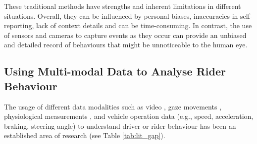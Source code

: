 These traditional methods have strengths and inherent limitations in different situations. Overall, they can be influenced by personal biases, inaccuracies in self-reporting, lack of context details and can be time-consuming. In contrast, the use of sensors and cameras to capture events as they occur can provide an unbiased and detailed record of behaviours that might be unnoticeable to the human eye.

    \subsection{Using Multi-modal Data to Analyse Rider Behaviour}

The usage of different data modalities such as video \cite{hong2022evaluation, 10.1145/3313831.3376499,KOVACSOVA2018270, KAYA2021106380, WHITE2023182}, gaze movements \cite{visualAttenstionTobii, 10.1145/3544548.3581049, MANTUANO2017408,10.1145/3204493.3214307, KAYA2021106380, VONSTULPNAGEL2020222}, physiological measurements \cite{COBB2021172, PhysiologicalCyclist, distefano2020physiological},
and vehicle operation data (e.g., speed, acceleration, braking, steering angle) \cite{MORGENSTERN2020104740, doi:10.1080/15389588.2019.1643015} to understand driver or rider behaviour has been an established area of research (see Table \ref{tab:lit_gap}).


